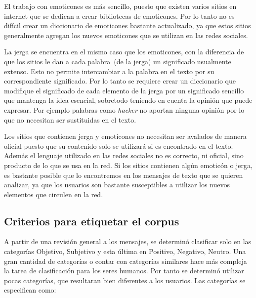 
  
  El trabajo con emoticones es más sencillo, puesto que existen varios sitios en internet
  que se dedican a crear bibliotecas de emoticones. Por lo tanto no es difícil crear
  un diccionario de emoticones bastante actualizado, ya que estos sitios generalmente
  agregan los nuevos emoticones que se utilizan en las redes sociales.
  
  
  La jerga se encuentra en el mismo caso que los emoticones, con la diferencia
  de que los sitios le dan a cada palabra~(de la jerga) un significado usualmente 
  extenso. Esto no permite intercambiar a la palabra en el texto por su correspondiente 
  significado. Por lo tanto se requiere crear un diccionario que modifique el significado
  de cada elemento de la jerga por un significado sencillo que mantenga la idea esencial,
  sobretodo teniendo en cuenta la opinión que puede expresar. Por ejemplo palabras como 
  \emph{hacker} no aportan ninguna opinión por lo que no necesitan ser sustituidas en el texto.
  
  Los sitios que contienen jerga y emoticones no necesitan ser avalados de manera oficial
  puesto que su contenido solo se utilizará si es encontrado en el texto. Además el 
  lenguaje utilizado en las redes sociales no es correcto, ni oficial, sino producto 
  de lo que se usa en la red. Si los sitios contienen algún emoticón o jerga, es 
  bastante posible que lo encontremos en los mensajes de texto que se quieren analizar,
  ya que los usuarios son bastante susceptibles a utilizar los nuevos elementos
  que circulen en la red.
  
 
 \subsection{Criterios para etiquetar el corpus}
 
 A partir de una revisión general a los mensajes, se determinó
 clasificar solo en las categorías Objetivo, Subjetivo y esta última en Positivo, Negativo, Neutro.
 Una gran cantidad de categorías o contar con categorías similares hace más compleja la tarea
 de clasificación para los seres humanos. Por tanto se determinó utilizar pocas categorías, que resultaran 
 bien diferentes a los usuarios. Las categorías se especifican como: 
 
